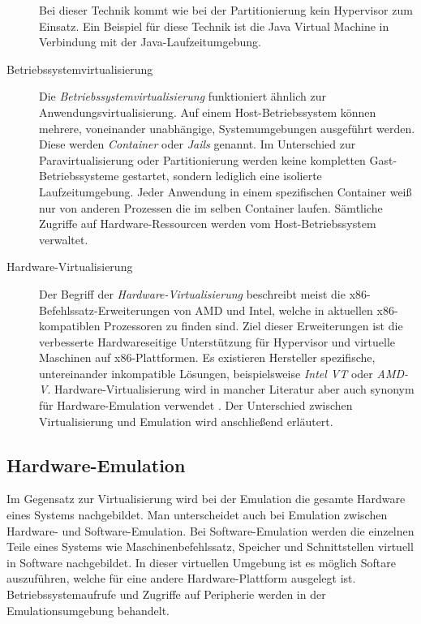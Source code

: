 \begin{description}
        Bei dieser Technik kommt wie bei der Partitionierung kein Hypervisor
        zum Einsatz.
        Ein Beispiel für diese Technik ist die Java Virtual Machine in
        Verbindung mit der Java-Laufzeitumgebung.
    \item[Betriebssystemvirtualisierung]
        Die \textit{Betriebssystemvirtualisierung} funktioniert ähnlich zur
        Anwendungsvirtualisierung.
        Auf einem Host-Betriebssystem können mehrere, voneinander unabhängige,
        Systemumgebungen ausgeführt werden\cite{BSKompakt_Virt}.
        Diese werden \textit{Container} oder \textit{Jails} genannt.
        Im Unterschied zur Paravirtualisierung oder Partitionierung werden
        keine kompletten Gast-Betriebssysteme gestartet, sondern lediglich eine
        isolierte Laufzeitumgebung.
        Jeder Anwendung in einem spezifischen Container weiß nur von anderen
        Prozessen die im selben Container laufen.
        Sämtliche Zugriffe auf Hardware-Ressourcen werden vom
        Host-Betriebssystem verwaltet.
    \item[Hardware-Virtualisierung]
        Der Begriff der \textit{Hardware-Virtualisierung} beschreibt meist die
        x86-Befehlssatz-Erweiterungen von AMD und Intel, welche in aktuellen
        x86-kompatiblen Prozessoren zu finden sind\cite{BSKompakt_Virt}.
        Ziel dieser Erweiterungen ist die verbesserte Hardwareseitige
        Unterstützung für Hypervisor und virtuelle Maschinen auf
        x86-Plattformen.
        Es existieren Hersteller spezifische, untereinander inkompatible
        Lösungen, beispielsweise \textit{Intel VT} oder \textit{AMD-V}.
        Hardware-Virtualisierung wird in mancher Literatur aber auch synonym
        für Hardware-Emulation verwendet
        \cite{MasterkursVirtParaSys_Virt}.
        Der Unterschied zwischen Virtualisierung und Emulation wird
        anschließend erläutert.
\end{description}

\subsection{Hardware-Emulation}

Im Gegensatz zur Virtualisierung wird bei der Emulation die gesamte Hardware
eines Systems nachgebildet.
Man unterscheidet auch bei Emulation zwischen Hardware- und Software-Emulation.
Bei Software-Emulation werden die einzelnen Teile eines Systems wie
Maschinenbefehlssatz, Speicher und Schnittstellen virtuell in Software
nachgebildet\cite{BSKompakt_Virt}.
In dieser virtuellen Umgebung ist es möglich Softare auszuführen, welche
für eine andere Hardware-Plattform ausgelegt ist\cite{BSKompakt_Virt}.
Betriebssystemaufrufe und Zugriffe auf Peripherie werden in der
Emulationsumgebung behandelt.

